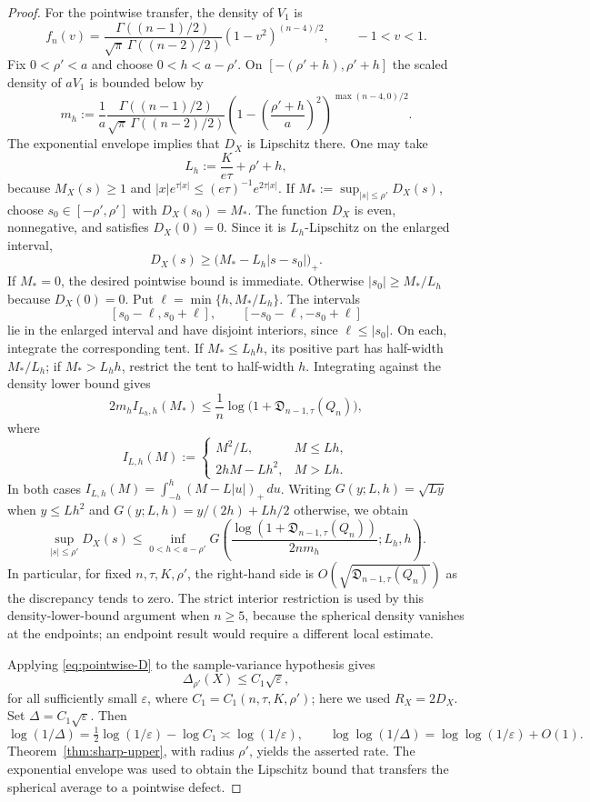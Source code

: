 \begin{proof}
For the pointwise transfer, the density of $V_1$ is
\[
f_n(v)=
\frac{\Gamma((n-1)/2)}{\sqrt\pi\,\Gamma((n-2)/2)}
(1-v^2)^{(n-4)/2},
\qquad -1<v<1.
\]
Fix $0<\rho'<a$ and choose $0<h<a-\rho'$. On $[-(\rho'+h),\rho'+h]$ the scaled density of $aV_1$ is bounded below by
\[
m_h:=\frac1a\frac{\Gamma((n-1)/2)}{\sqrt\pi\,\Gamma((n-2)/2)}
\left(1-\left(\frac{\rho'+h}{a}\right)^2\right)^{\max(n-4,0)/2}.
\]
The exponential envelope implies that $D_X$ is Lipschitz there. One may take
\[
L_h:=\frac{K}{e\tau}+\rho'+h,
\]
because $M_X(s)\ge1$ and $|x|e^{\tau|x|}\le(e\tau)^{-1}e^{2\tau|x|}$. If $M_*:=\sup_{|s|\le\rho'}D_X(s)$, choose $s_0\in[-\rho',\rho']$ with $D_X(s_0)=M_*$. The function $D_X$ is even, nonnegative, and satisfies $D_X(0)=0$. Since it is $L_h$-Lipschitz on the enlarged interval,
\[
D_X(s)\ge\bigl(M_*-L_h|s-s_0|\bigr)_+.
\]
If $M_*=0$, the desired pointwise bound is immediate. Otherwise $|s_0|\ge M_*/L_h$ because $D_X(0)=0$. Put $\ell=\min\{h,M_*/L_h\}$. The intervals
\[
[s_0-\ell,s_0+\ell],\qquad [-s_0-\ell,-s_0+\ell]
\]
lie in the enlarged interval and have disjoint interiors, since $\ell\le|s_0|$. On each, integrate the corresponding tent. If $M_*\le L_hh$, its positive part has half-width $M_*/L_h$; if $M_*>L_hh$, restrict the tent to half-width $h$. Integrating against the density lower bound gives
\[
2m_h I_{L_h,h}(M_*)
 \le \frac1n\log\bigl(1+\mathfrak D_{n-1,\tau}(Q_n)\bigr),
\]
where
\[
I_{L,h}(M):=
\begin{cases}
M^2/L,& M\le Lh,\\
2hM-Lh^2,& M>Lh.
\end{cases}
\]
In both cases $I_{L,h}(M)=\int_{-h}^h(M-L|u|)_+\,du$. Writing $G(y;L,h)=\sqrt{Ly}$ when $y\le Lh^2$ and $G(y;L,h)=y/(2h)+Lh/2$ otherwise, we obtain
\begin{equation}\label{eq:pointwise-D}
\sup_{|s|\le\rho'}D_X(s)
\le\inf_{0<h<a-\rho'}G\left(\frac{\log(1+\mathfrak D_{n-1,\tau}(Q_n))}{2nm_h};L_h,h\right).
\end{equation}
In particular, for fixed $n,\tau,K,\rho'$, the right-hand side is $O(\sqrt{\mathfrak D_{n-1,\tau}(Q_n)})$ as the discrepancy tends to zero. The strict interior restriction is used by this density-lower-bound argument when $n\ge5$, because the spherical density vanishes at the endpoints; an endpoint result would require a different local estimate.

Applying \eqref{eq:pointwise-D} to the sample-variance hypothesis gives
\[
\Delta_{\rho'}(X)
\le C_1\sqrt{\varepsilon},
\]
for all sufficiently small $\varepsilon$, where $C_1=C_1(n,\tau,K,\rho')$; here we used $R_X=2D_X$. Set $\Delta=C_1\sqrt{\varepsilon}$. Then
\[
\log(1/\Delta)=\tfrac12\log(1/\varepsilon)-\log C_1
\asymp \log(1/\varepsilon),
\qquad
\log\log(1/\Delta)=\log\log(1/\varepsilon)+O(1).
\]
Theorem~\ref{thm:sharp-upper}, with radius $\rho'$, yields the asserted rate. The exponential envelope was used to obtain the Lipschitz bound that transfers the spherical average to a pointwise defect.
\end{proof}

